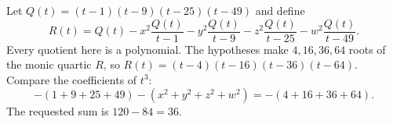 Let $Q(t)=(t-1)(t-9)(t-25)(t-49)$ and define
\[R(t)=Q(t)-x^2\dfrac{Q(t)}{t-1}-y^2\dfrac{Q(t)}{t-9}-z^2\dfrac{Q(t)}{t-25}-w^2\dfrac{Q(t)}{t-49}.\]
Every quotient here is a polynomial. The hypotheses make $4,16,36,64$ roots of the monic quartic $R$, so $R(t)=(t-4)(t-16)(t-36)(t-64)$. Compare the coefficients of $t^3$:
\[-(1+9+25+49)-(x^2+y^2+z^2+w^2)=-(4+16+36+64).\]
The requested sum is $120-84=\boxed{36}$.
